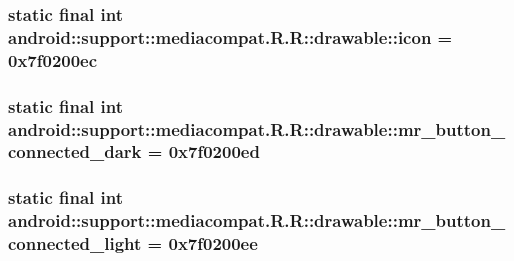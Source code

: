 \hypertarget{classandroid_1_1support_1_1mediacompat_1_1_r_1_1drawable_600e98a1982dee8511309b6320a20671}{
\subsubsection[{icon}]{\setlength{\rightskip}{0pt plus 5cm}static final int android::support::mediacompat.R.R::drawable::icon = 0x7f0200ec}}
\label{classandroid_1_1support_1_1mediacompat_1_1_r_1_1drawable_600e98a1982dee8511309b6320a20671}


\hypertarget{classandroid_1_1support_1_1mediacompat_1_1_r_1_1drawable_1def96ea31a3d804bdb248ffdbf5bc00}{
\subsubsection[{mr\_\-button\_\-connected\_\-dark}]{\setlength{\rightskip}{0pt plus 5cm}static final int android::support::mediacompat.R.R::drawable::mr\_\-button\_\-connected\_\-dark = 0x7f0200ed}}
\label{classandroid_1_1support_1_1mediacompat_1_1_r_1_1drawable_1def96ea31a3d804bdb248ffdbf5bc00}


\hypertarget{classandroid_1_1support_1_1mediacompat_1_1_r_1_1drawable_9e58e0f46aee5adc1eb444add61462f9}{
\subsubsection[{mr\_\-button\_\-connected\_\-light}]{\setlength{\rightskip}{0pt plus 5cm}static final int android::support::mediacompat.R.R::drawable::mr\_\-button\_\-connected\_\-light = 0x7f0200ee}}
\label{classandroid_1_1support_1_1mediacompat_1_1_r_1_1drawable_9e58e0f46aee5adc1eb444add61462f9}



